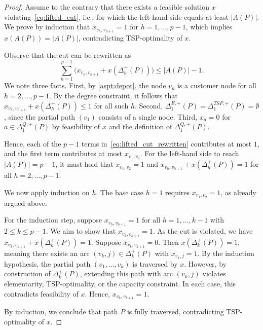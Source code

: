 \documentclass[a4paper,fleqn]{cas-dc}%
\begin{document}
\begin{proof}
Assume to the contrary that there exists a feasible solution $x$ violating~\eqref{eq:lifted_cut}, i.e., for which the left-hand side equals at least $|A(P)|$. We prove by induction that $x_{v_h, v_{h+1}} = 1$ for $h = 1, \ldots, p-1$, which implies $x(A(P)) = |A(P)|$, contradicting TSP-optimality of $x$.

Observe that the cut can be rewritten as
\begin{equation}
\sum_{h=1}^{p-1} \big( x_{v_h, v_{h+1}} + x(\Delta^{+}_{h}(P)) \big) \leq |A(P)| - 1. \label{eq:lifted_cut_rewritten}
\end{equation}
We note three facts. First, by \eqref{aspt:depot}, the node $v_h$ is a customer node for all $h = 2, \ldots, p-1$. By the degree constraint, it follows that $x_{v_h, v_{h+1}} + x(\Delta^{+}_{h}(P)) \leq 1$ for all such $h$. Second, $\Delta^{E,+}_{1}(P) = \Delta^{TSP,+}_{1}(P) = \emptyset$, since the partial path $(v_1)$ consists of a single node. Third, $x_a=0$ for $a\in \Delta^{Q,+}_{1}(P)$ by feasibility of $x$ and the definition of $\Delta^{Q,+}_{1}(P)$.

Hence, each of the $p-1$ terms in~\eqref{eq:lifted_cut_rewritten} contributes at most $1$, and the first term contributes at most $x_{v_1, v_2}$. For the left-hand side to reach $|A(P)| = p - 1$, it must hold that $x_{v_1, v_2} = 1$ and $x_{v_h, v_{h+1}} + x(\Delta^{+}_{h}(P)) = 1$ for all $h = 2, \ldots, p-1$.

We now apply induction on $h$. The base case $h=1$ requires $x_{v_1, v_2} = 1$, as already argued above.

For the induction step, suppose $x_{v_h, v_{h+1}} = 1$ for all $h = 1, \ldots, k-1$ with $2 \leq k \leq p-1$. We aim to show that $x_{v_k, v_{k+1}} = 1$. As the cut is violated, we have $x_{v_k, v_{k+1}} + x(\Delta^{+}_{k}(P)) = 1$. Suppose $x_{v_k, v_{k+1}} = 0$. Then $x(\Delta^{+}_{k}(P)) = 1$, meaning there exists an arc $(v_k, j) \in \Delta^{+}_{k}(P)$ with $x_{v_k, j} = 1$. By the induction hypothesis, the partial path $(v_1, \ldots, v_k)$ is traversed by $x$. However, by construction of $\Delta^{+}_{k}(P)$, extending this path with arc $(v_k, j)$ violates elementarity, TSP-optimality, or the capacity constraint. In each case, this contradicts feasibility of $x$. Hence, $x_{v_k, v_{k+1}} = 1$.

By induction, we conclude that path $P$ is fully traversed, contradicting TSP-optimality of $x$.
\end{proof}
\end{document}
